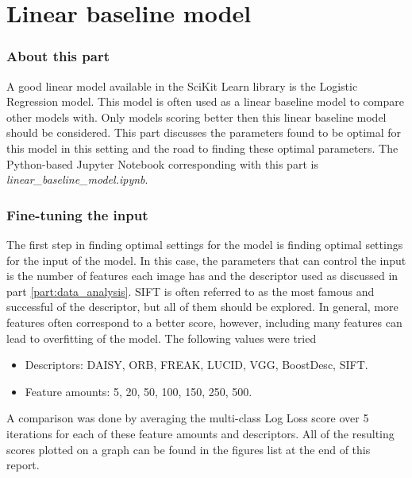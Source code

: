 \part{Linear baseline model}
\label{part:linear_baseline}


\section{About this part}
\label{section:LBM_about_part}
A good linear model available in the SciKit Learn library is the Logistic Regression model.
This model is often used as a linear baseline model to compare other models with.
Only models scoring better then this linear baseline model should be considered.
This part discusses the parameters found to be optimal for this model in this setting and the road to finding these optimal parameters.
The Python-based Jupyter Notebook corresponding with this part is \emph{linear\_baseline\_model.ipynb}.


\section{Fine-tuning the input}
\label{section:LBM_finetuning_features}
The first step in finding optimal settings for the model is finding optimal settings for the input of the model.
In this case, the parameters that can control the input is the number of features each image has and the descriptor used as discussed in part \ref{part:data_analysis}.
SIFT is often referred to as the most famous and successful of the descriptor, but all of them should be explored.
In general, more features often correspond to a better score, however, including many features can lead to overfitting of the model.
The following values were tried
\begin{itemize}
    \item Descriptors: DAISY, ORB, FREAK, LUCID, VGG, BoostDesc, SIFT.
    \item Feature amounts: 5, 20, 50, 100, 150, 250, 500.
\end{itemize}

A comparison was done by averaging the multi-class Log Loss score over 5 iterations for each of these feature amounts and descriptors.
All of the resulting scores plotted on a graph can be found in the figures list at the end of this report.


